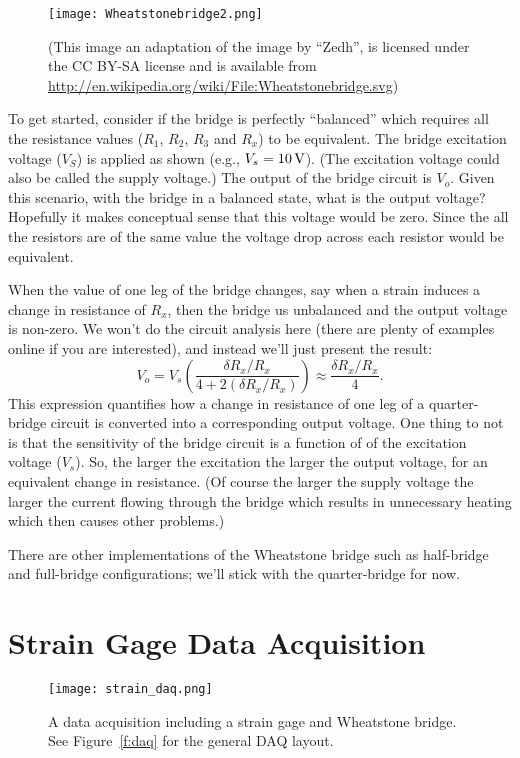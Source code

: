\begin{figure}[hbt!]
\centerline{
{\texttt{[image: Wheatstonebridge2.png]}}}
\caption{  (This image an adaptation of the image by ``Zedh'', is licensed under the CC BY-SA license and is available from \url{http://en.wikipedia.org/wiki/File:Wheatstonebridge.svg}) }
\label{f:bridge}
\end{figure}

To get started, consider if the bridge is perfectly ``balanced'' which requires all the resistance values ($R_1$, $R_2$, $R_3$ and $R_x$) to be equivalent.  The \gls{bridge excitation voltage} ($V_S$) is applied as shown (e.g., $V_s=\unit[10]{V}$).  (The excitation voltage could also be called the supply voltage.) The output of the bridge circuit is $V_o$.  Given this scenario, with the bridge in a balanced state, what is the output voltage?  Hopefully it makes conceptual sense that this voltage would be zero.  Since the all the resistors are of the same value the voltage drop across each resistor would be equivalent.

When the value of one leg of the bridge changes, say when a strain induces a change in resistance of $R_x$, then the bridge us unbalanced and the output voltage is non-zero.  We won't do the circuit analysis here (there are plenty of examples online if you are interested), and instead we'll just present the result:
\begin{equation}\label{e:bridge}
V_o = V_s \left( \frac{\delta R_x/R_x}{4+2(\delta R_x/R_x)} \right) \approx \frac{\delta R_x/R_x}{4}.
\end{equation}
This expression quantifies how a change in resistance of one leg of a quarter-bridge circuit is converted into a corresponding output voltage.  One thing to not is that the sensitivity of the bridge circuit is a function of of the excitation voltage ($V_s$).  So, the larger the excitation the larger the output voltage, for an equivalent change in resistance.  (Of course the larger the supply voltage the larger the current flowing through the bridge which results in unnecessary heating which then causes other problems.)

There are other implementations of the Wheatstone bridge such as half-bridge and full-bridge configurations; we'll stick with the quarter-bridge for now.

\section{Strain Gage Data Acquisition}
\begin{figure}[hbt!]
\centering
\texttt{[image: strain\_daq.png]}
\caption{A data acquisition including a strain gage and Wheatstone bridge.  See Figure~\ref{f:daq} for the general DAQ layout.}
\label{f:straindaq}
\end{figure}

